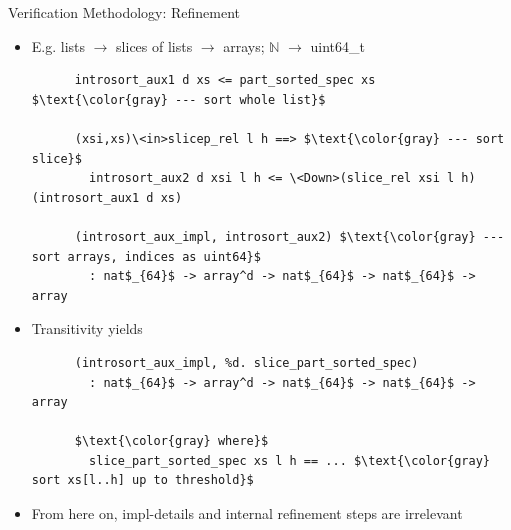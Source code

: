 \documentclass[fleqn]{beamer}
\begin{document}
\begin{frame}[fragile]{Verification Methodology: Refinement}
  \begin{itemize}
   \item<+-> E.g. lists $\rightarrow$ slices of lists $\rightarrow$ arrays; $\mathbb N$ $\rightarrow$ uint64\_t
    \onslide<+->
    \begin{lstlisting}
      introsort_aux1 d xs <= part_sorted_spec xs $\text{\color{gray} --- sort whole list}$

      (xsi,xs)\<in>slicep_rel l h ==> $\text{\color{gray} --- sort slice}$
        introsort_aux2 d xsi l h <= \<Down>(slice_rel xsi l h) (introsort_aux1 d xs)

      (introsort_aux_impl, introsort_aux2) $\text{\color{gray} --- sort arrays, indices as uint64}$
        : nat$_{64}$ -> array^d -> nat$_{64}$ -> nat$_{64}$ -> array
    \end{lstlisting}

   \item<+-> Transitivity yields
    \begin{lstlisting}
      (introsort_aux_impl, %d. slice_part_sorted_spec)
        : nat$_{64}$ -> array^d -> nat$_{64}$ -> nat$_{64}$ -> array

      $\text{\color{gray} where}$
        slice_part_sorted_spec xs l h == ... $\text{\color{gray} sort xs[l..h] up to threshold}$

    \end{lstlisting}

   \item<+-> From here on, impl-details and internal refinement steps are irrelevant

  \end{itemize}
\end{frame}
\end{document}
